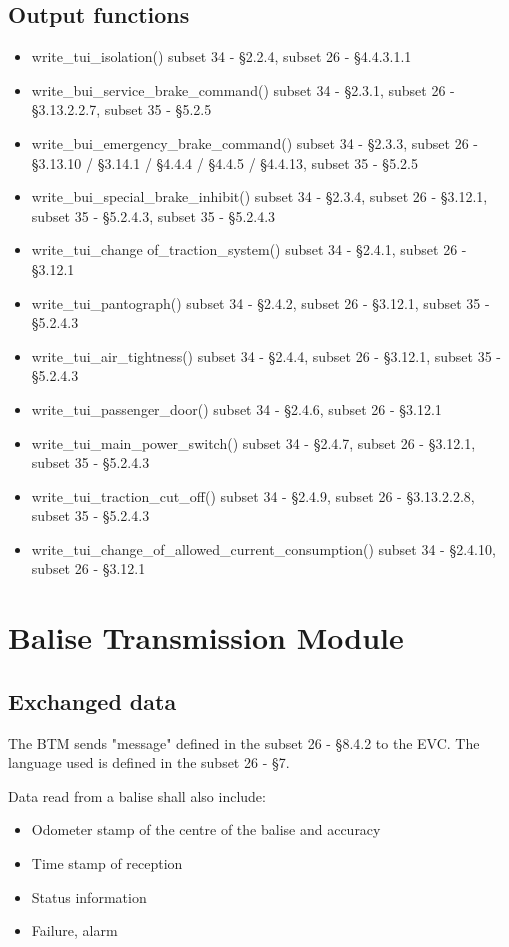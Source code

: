 \documentclass{template/openetcs_article}
\begin{document}
	\subsection{Output functions}
		\begin{itemize}
			\item write\_tui\_isolation()
				\subitem subset 34 - §2.2.4, subset 26 - §4.4.3.1.1
			\item write\_bui\_service\_brake\_command()
				\subitem subset 34 - §2.3.1, subset 26 - §3.13.2.2.7, subset 35 - §5.2.5
			\item write\_bui\_emergency\_brake\_command()
				\subitem subset 34 - §2.3.3, subset 26 - §3.13.10 / §3.14.1 / §4.4.4 / §4.4.5 / §4.4.13, subset 35 - §5.2.5
			\item write\_bui\_special\_brake\_inhibit()
				\subitem subset 34 - §2.3.4, subset 26 - §3.12.1, subset 35 - §5.2.4.3, subset 35 - §5.2.4.3
			\item write\_tui\_change of\_traction\_system()
				\subitem subset 34 - §2.4.1, subset 26 - §3.12.1
			\item write\_tui\_pantograph()
				\subitem subset 34 - §2.4.2, subset 26 - §3.12.1, subset 35 - §5.2.4.3
			\item write\_tui\_air\_tightness()
				\subitem subset 34 - §2.4.4, subset 26 - §3.12.1, subset 35 - §5.2.4.3
			\item write\_tui\_passenger\_door()
				\subitem subset 34 - §2.4.6, subset 26 - §3.12.1
			\item write\_tui\_main\_power\_switch()
				\subitem subset 34 - §2.4.7, subset 26 - §3.12.1, subset 35 - §5.2.4.3
			\item write\_tui\_traction\_cut\_off()
				\subitem subset 34 - §2.4.9, subset 26 - §3.13.2.2.8, subset 35 - §5.2.4.3
			\item write\_tui\_change\_of\_allowed\_current\_consumption()
				\subitem subset 34 - §2.4.10, subset 26 - §3.12.1		
		\end{itemize}
\section{Balise Transmission Module}
	\subsection{Exchanged data}
		The BTM sends "message" defined in the subset 26 - §8.4.2 to the EVC. The language used is defined in the subset 26 - §7.
		
		Data read from a balise shall also include:
		\begin{itemize}
			\item Odometer stamp of the centre of the balise and accuracy
			\item Time stamp of reception
			\item Status information
			\item Failure, alarm
		\end{itemize}
		
\end{document}
